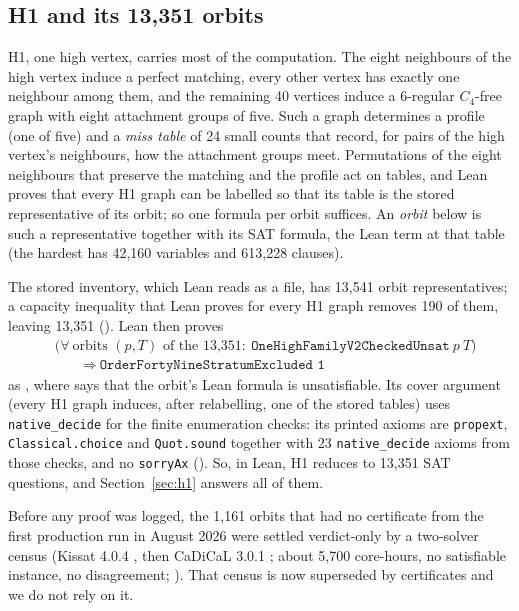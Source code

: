 \documentclass{anvil-paper}
\newcommand{\repobase}{https://github.com/rjwalters/lean-genius/blob/erdos85/integration}
\newcommand{\repofile}[2]{\href{\repobase/#1}{\lean{#2}}}
\newcommand{\rp}{research/problems/erdos-85-wip-01}
\theoremstyle{definition}
\begin{document}
\subsection{H1 and its 13,351 orbits}\label{sec:h1-structure}

H1, one high vertex, carries most of the computation. The eight neighbours of the high vertex induce a perfect matching, every other vertex has exactly one neighbour among them, and the remaining 40 vertices induce a 6-regular $C_4$-free graph with eight attachment groups of five. Such a graph determines a profile (one of five) and a \emph{miss table} of 24 small counts that record, for pairs of the high vertex's neighbours, how the attachment groups meet. Permutations of the eight neighbours that preserve the matching and the profile act on tables, and Lean proves that every H1 graph can be labelled so that its table is the stored representative of its orbit; so one formula per orbit suffices. An \emph{orbit} below is such a representative together with its SAT formula, the Lean term  at that table (the hardest has 42,160 variables and 613,228 clauses).

The stored inventory, which Lean reads as a file, has 13,541 orbit representatives; a capacity inequality that Lean proves for every H1 graph removes 190 of them, leaving 13,351 (). Lean then proves
\[
\begin{aligned}
&\bigl(\forall\ \text{orbits } (p,T) \text{ of the 13,351}:\ \texttt{OneHighFamilyV2CheckedUnsat}\ p\ T\bigr)\\
&\qquad\Longrightarrow\ \texttt{OrderFortyNineStratumExcluded 1}
\end{aligned}
\]
as , where  says that the orbit's Lean formula is unsatisfiable. Its cover argument (every H1 graph induces, after relabelling, one of the stored tables) uses \texttt{native\_decide} for the finite enumeration checks: its printed axioms are \texttt{propext}, \texttt{Classical.choice} and \texttt{Quot.sound} together with 23 \texttt{native\_decide} axioms from those checks, and no \texttt{sorryAx} (\repofile{\rp/h1_cert_pilot_20261001/H1_COVER_AXIOMS_20261006.txt}{H1_COVER_AXIOMS_20261006.txt}). So, in Lean, H1 reduces to 13,351 SAT questions, and Section~\ref{sec:h1} answers all of them.

Before any proof was logged, the 1,161 orbits that had no certificate from the first production run in August 2026 were settled verdict-only by a two-solver census (Kissat 4.0.4 \citep{biere2024kissat}, then CaDiCaL 3.0.1 \citep{biere2020cadical}; about 5,700 core-hours, no satisfiable instance, no disagreement; \repofile{\rp/phase_b_h1_census_20260927/CENSUS.md}{CENSUS.md}). That census is now superseded by certificates and we do not rely on it.
\end{document}
